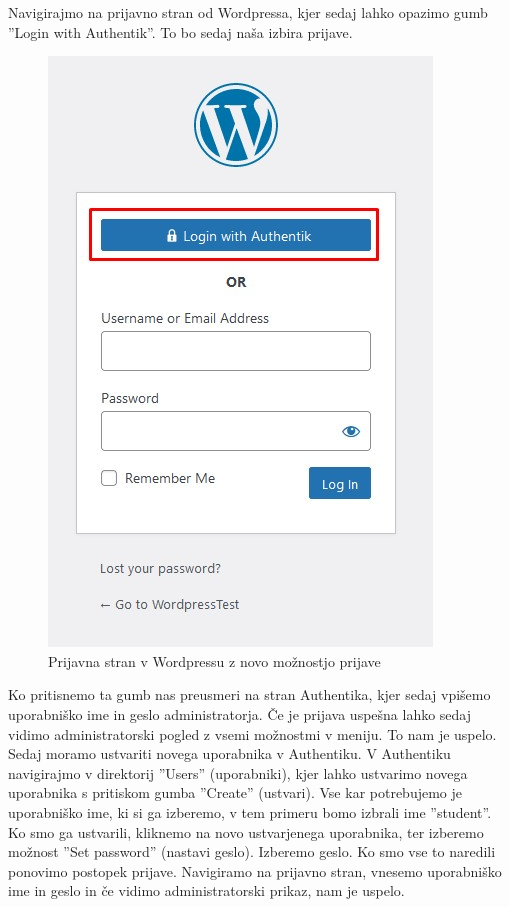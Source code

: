 \documentclass[a4paper,12pt,openright]{book}
\begin{document}
{Navigirajmo na prijavno stran od Wordpressa, kjer sedaj lahko opazimo gumb ''Login with Authentik''. To bo sedaj naša izbira prijave. 


\begin{figure}[H]
\includegraphics[scale=0.9]{diploma-FRI-vzorec_11maj2021/WordpressLOGIN.jpg}
\caption{Prijavna stran v Wordpressu z novo možnostjo prijave}
\label{fig}
\end{figure}

Ko pritisnemo ta gumb nas preusmeri na stran Authentika, kjer sedaj vpišemo uporabniško ime in geslo administratorja. Če je prijava uspešna lahko sedaj vidimo administratorski pogled z vsemi možnostmi v meniju. 
\newline
To nam je uspelo. Sedaj moramo ustvariti novega uporabnika v Authentiku. V Authentiku navigirajmo v direktorij ''Users'' (uporabniki), kjer lahko ustvarimo novega uporabnika s pritiskom gumba ''Create'' (ustvari). Vse kar potrebujemo je uporabniško ime, ki si ga izberemo, v tem primeru bomo izbrali ime ''student''. Ko smo ga ustvarili, kliknemo na novo ustvarjenega uporabnika, ter izberemo možnost ''Set password'' (nastavi geslo). Izberemo geslo.  
\newline
Ko smo vse to naredili ponovimo postopek prijave. Navigiramo na prijavno stran, vnesemo uporabniško ime in geslo in če vidimo administratorski prikaz, nam je uspelo. 
\newline

}
\end{document}
